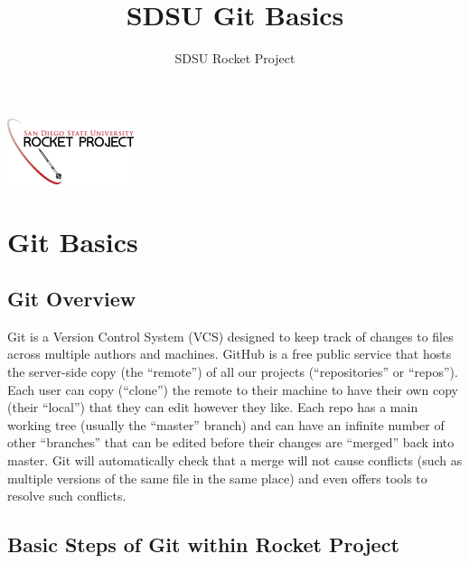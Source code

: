 \documentclass{article}
\title{SDSU Git Basics}
\author{SDSU Rocket Project}
\begin{document}
\maketitle

\begin{center}
	\includegraphics{rocketlogo.png}
\end{center}

\tableofcontents

\pagebreak

\section{Git Basics}

\subsection{Git Overview}

Git is a Version Control System (VCS) designed to keep track of changes to files across multiple authors and machines.
GitHub is a free public service that hosts the server-side copy (the ``remote'') of all our projects (``repositories'' or ``repos'').
Each user can copy (``clone'') the remote to their machine to have their own copy (their ``local'') that they can edit however they like.
Each repo has a main working tree (usually the ``master'' branch) and can have an infinite number of other ``branches'' that can be edited before their changes are ``merged'' back into master.
Git will automatically check that a merge will not cause conflicts (such as multiple versions of the same file in the same place) and even offers tools to resolve such conflicts.

\subsection{Basic Steps of Git within Rocket Project}
\end{document}
